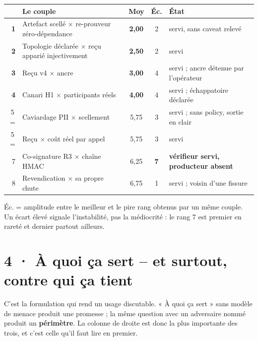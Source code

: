 \documentclass[10pt]{article}
\newcommand{\pire}[1]{{\color{red}\textbf{#1}}}
\newcommand{\sz}[1]{{\small\color{grey}\textsf{#1}}}
\newcommand{\x}{$\times$}
\begin{document}
\renewcommand{\arraystretch}{1.1}
\begin{center}\small
\begin{tabular}{@{}r >{\raggedright\arraybackslash}p{6.3cm} c c >{\raggedright\arraybackslash}p{6.0cm}@{}}
\toprule
& \textbf{Le couple} & \textbf{Moy} & \sz{Éc.} & \textbf{État} \\
\midrule
\textbf{1} & Artefact scellé \x{} re-prouveur zéro-dépendance & \textbf{2,00} & 2 & servi, sans caveat relevé \\
\textbf{2} & Topologie déclarée \x{} reçu apparié injectivement & \textbf{2,50} & 2 & servi \\
\textbf{3} & Reçu v4 \x{} ancre & \textbf{3,00} & 4 & servi ; ancre détenue par l'opérateur \\
\textbf{4} & Canari H1 \x{} participants réels & \textbf{4,00} & 4 & servi ; échappatoire déclarée \\
5\,= & Caviardage PII \x{} scellement & 5,75 & 3 & servi ; sans policy, sortie en clair \\
5\,= & Reçu \x{} coût réel par appel & 5,75 & 3 & servi \\
7 & Co-signature R3 \x{} chaîne HMAC & 6,25 & \pire{7} & \textbf{vérifieur servi, producteur absent} \\
8 & Revendication \x{} sa propre chute & 6,75 & 1 & servi ; voisin d'une fissure \\
\bottomrule
\end{tabular}
\end{center}

\sz{Éc. = amplitude entre le meilleur et le pire rang obtenus par un même couple. Un écart élevé
signale l'instabilité, pas la médiocrité : le rang 7 est premier en rareté et dernier partout ailleurs.}

\section{4 · À quoi ça sert -- et surtout, contre qui ça tient}

C'est la formulation qui rend un usage discutable. « À quoi ça sert » sans modèle de menace produit une
promesse ; la même question avec un adversaire nommé produit un \textbf{périmètre}. La colonne de
droite est donc la plus importante des trois, et c'est celle qu'il faut lire en premier.
\end{document}
